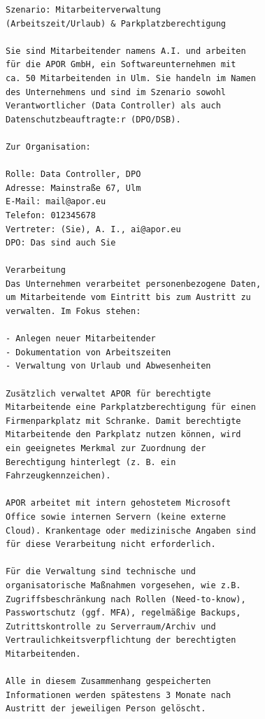 \begingroup
{}
\begin{lstlisting}
Szenario: Mitarbeiterverwaltung
(Arbeitszeit/Urlaub) & Parkplatzberechtigung

Sie sind Mitarbeitender namens A.I. und arbeiten
für die APOR GmbH, ein Softwareunternehmen mit
ca. 50 Mitarbeitenden in Ulm. Sie handeln im Namen
des Unternehmens und sind im Szenario sowohl
Verantwortlicher (Data Controller) als auch
Datenschutzbeauftragte:r (DPO/DSB).

Zur Organisation:

Rolle: Data Controller, DPO
Adresse: Mainstraße 67, Ulm
E-Mail: mail@apor.eu
Telefon: 012345678
Vertreter: (Sie), A. I., ai@apor.eu
DPO: Das sind auch Sie

Verarbeitung
Das Unternehmen verarbeitet personenbezogene Daten,
um Mitarbeitende vom Eintritt bis zum Austritt zu
verwalten. Im Fokus stehen:

- Anlegen neuer Mitarbeitender
- Dokumentation von Arbeitszeiten
- Verwaltung von Urlaub und Abwesenheiten

Zusätzlich verwaltet APOR für berechtigte
Mitarbeitende eine Parkplatzberechtigung für einen
Firmenparkplatz mit Schranke. Damit berechtigte
Mitarbeitende den Parkplatz nutzen können, wird
ein geeignetes Merkmal zur Zuordnung der
Berechtigung hinterlegt (z. B. ein
Fahrzeugkennzeichen).

APOR arbeitet mit intern gehostetem Microsoft
Office sowie internen Servern (keine externe
Cloud). Krankentage oder medizinische Angaben sind
für diese Verarbeitung nicht erforderlich.

Für die Verwaltung sind technische und
organisatorische Maßnahmen vorgesehen, wie z.B.
Zugriffsbeschränkung nach Rollen (Need-to-know),
Passwortschutz (ggf. MFA), regelmäßige Backups,
Zutrittskontrolle zu Serverraum/Archiv und
Vertraulichkeitsverpflichtung der berechtigten
Mitarbeitenden.

Alle in diesem Zusammenhang gespeicherten
Informationen werden spätestens 3 Monate nach
Austritt der jeweiligen Person gelöscht.
\end{lstlisting}
\endgroup

